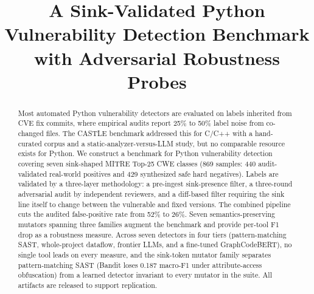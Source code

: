 \documentclass[conference]{IEEEtran}
\begin{document}
\title{A Sink-Validated Python Vulnerability Detection Benchmark with Adversarial Robustness Probes}

\author{
\and
{}
\and
{}
}

\maketitle

\begin{abstract}
Most automated Python vulnerability detectors are evaluated on labels
inherited from CVE fix commits, where empirical audits report 25\% to 50\%
label noise from co-changed files. The CASTLE benchmark addressed this
for C/C++ with a hand-curated corpus and a static-analyzer-versus-LLM
study, but no comparable resource exists for Python. We construct a
benchmark for Python vulnerability detection covering seven sink-shaped
MITRE Top-25 CWE classes (869 samples: 440 audit-validated real-world
positives and 429 synthesized safe hard negatives). Labels are validated
by a three-layer methodology: a pre-ingest sink-presence filter, a
three-round adversarial audit by independent reviewers, and a diff-based
filter requiring the sink line itself to change between the vulnerable and
fixed versions. The combined pipeline cuts the audited false-positive rate
from 52\% to 26\%. Seven semantics-preserving mutators spanning three
families augment the benchmark and provide per-tool F1 drop as a
robustness measure. Across seven detectors in four tiers (pattern-matching
SAST, whole-project dataflow, frontier LLMs, and a fine-tuned
GraphCodeBERT), no single tool leads on every measure, and the sink-token
mutator family separates pattern-matching SAST (Bandit loses 0.187
macro-F1 under attribute-access obfuscation) from a learned detector
invariant to every mutator in the suite. All artifacts are released to
support replication.
\end{abstract}
\end{document}
